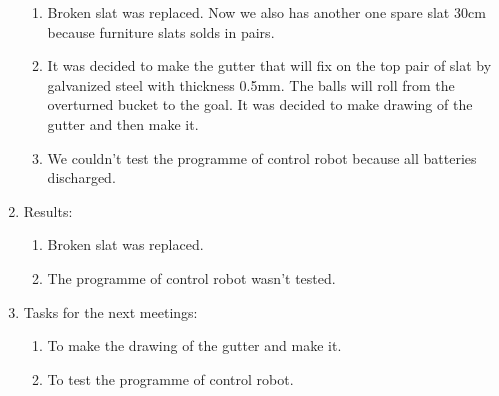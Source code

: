 \begin{enumerate}
\begin{enumerate}
		\item Broken slat was replaced. Now we also has another one spare slat 30cm because furniture slats solds in pairs.
		
        \item It was decided to make the gutter that will fix on the top pair of slat by galvanized steel with thickness 0.5mm. The balls will roll from the overturned bucket to the goal. It was decided to make drawing of the gutter and then make it.
        
        \item We couldn't test the programme of control robot because all batteries discharged.
        
	\end{enumerate}
	
	\item Results:
	\begin{enumerate}
		
		\item Broken slat was replaced.
        
        \item The programme of control robot wasn't tested.
		
	\end{enumerate}
	
	\item Tasks for the next meetings:
	\begin{enumerate}
		
		\item To make the drawing of the gutter and make it.
		
        \item To test the programme of control robot.
			
	\end{enumerate}
\end{enumerate}
\fillpage
